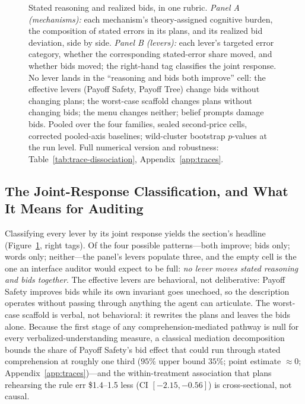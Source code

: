 \begin{figure}[htbp]
\begin{minipage}[t]{0.58\textwidth}
\begin{tikzpicture}
\end{tikzpicture}
\end{minipage}
\caption{Stated reasoning and realized bids, in one rubric. \emph{Panel A (mechanisms):} each mechanism's theory-assigned cognitive burden, the composition of stated errors in its plans, and its realized bid deviation, side by side. \emph{Panel B (levers):} each lever's targeted error category, whether the corresponding stated-error share moved, and whether bids moved; the right-hand tag classifies the joint response. No lever lands in the ``reasoning and bids both improve'' cell: the effective levers (Payoff Safety, Payoff Tree) change bids without changing plans; the worst-case scaffold changes plans without changing bids; the menu changes neither; belief prompts damage bids. Pooled over the four families, sealed second-price cells, corrected pooled-axis baselines; wild-cluster bootstrap $p$-values at the run level. Full numerical version and robustness: Table~\ref{tab:trace-dissociation}, Appendix~\ref{app:traces}.}
\label{fig:trace-flow}
\end{figure}

\subsection{The Joint-Response Classification, and What It Means for Auditing}\label{sec:traces-patterns}

Classifying every lever by its joint response yields the section's headline (Figure~\ref{fig:trace-flow}, right tags). Of the four possible patterns---both improve; bids only; words only; neither---the panel's levers populate three, and the empty cell is the one an interface auditor would expect to be full: \emph{no lever moves stated reasoning and bids together}. The effective levers are behavioral, not deliberative: Payoff Safety improves bids while its own invariant goes unechoed, so the description operates without passing through anything the agent can articulate. The worst-case scaffold is verbal, not behavioral: it rewrites the plans and leaves the bids alone. Because the first stage of any comprehension-mediated pathway is null for every verbalized-understanding measure, a classical mediation decomposition bounds the share of Payoff Safety's bid effect that could run through stated comprehension at roughly one third ($95\%$ upper bound $35\%$; point estimate $\approx 0$; Appendix~\ref{app:traces})---and the within-treatment association that plans rehearsing the rule err \$1.4--1.5 less (CI $[-2.15, -0.56]$) is cross-sectional, not causal.

